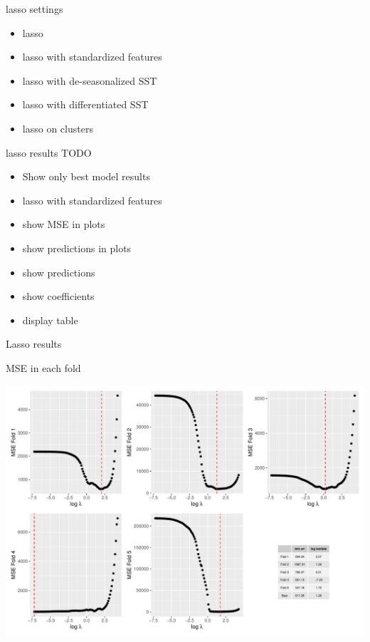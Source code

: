 \documentclass[
  ignorenonframetext,
]{beamer}
\providecommand{\tightlist}{%
  \setlength{\itemsep}{0pt}\setlength{\parskip}{0pt}}
\begin{document}
\begin{frame}{lasso settings}
\protect\hypertarget{lasso-settings}{}
\begin{itemize}
\tightlist
\item
  lasso
\item
  lasso with standardized features
\item
  lasso with de-seasonalized SST
\item
  lasso with differentiated SST
\item
  lasso on clusters
\end{itemize}
\end{frame}

\begin{frame}{lasso results TODO}
\protect\hypertarget{lasso-results-todo}{}
\begin{itemize}
\tightlist
\item
  Show only best model results
\item
  lasso with standardized features
\item
  show MSE in plots
\item
  show predictions in plots
\item
  show predictions
\item
  show coefficients
\item
  display table
\end{itemize}
\end{frame}

\begin{frame}{Lasso results}
\protect\hypertarget{lasso-results}{}
\end{frame}

\begin{frame}{MSE in each fold}
\protect\hypertarget{mse-in-each-fold}{}
\begin{center}\includegraphics[width=0.75\linewidth]{ma-presentation_files/figure-beamer/unnamed-chunk-16-1} \end{center}
\end{frame}
\end{document}
